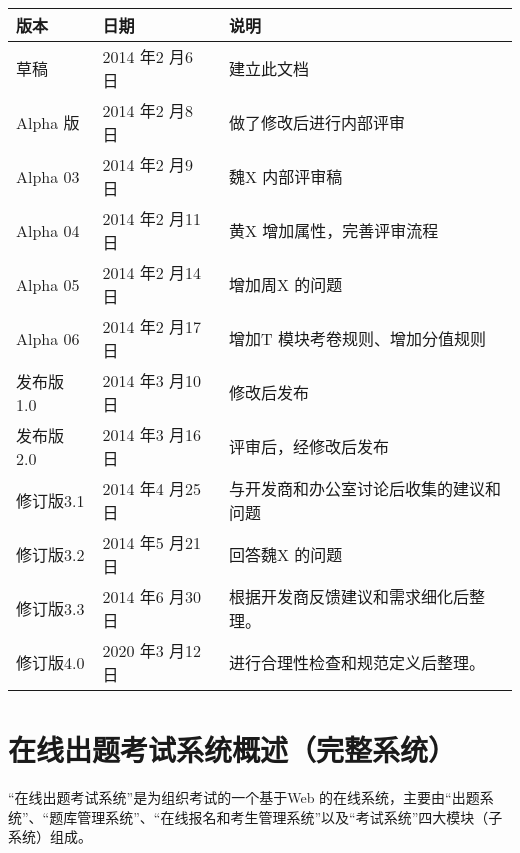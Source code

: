 \documentclass[hyperref, a4paper]{ctexart}
\begin{document}
\begin{center}
\begin{tabular}{|l|l|l|}
\hline
版本 & 日期 & 说明\\
\hline
草稿 & 2014 年2 月6 日 & 建立此文档\\
\hline
Alpha 版 & 2014 年2 月8 日 & 做了修改后进行内部评审\\
\hline
Alpha 03 & 2014 年2 月9 日 & 魏X 内部评审稿\\
\hline
Alpha 04 & 2014 年2 月11 日 & 黄X 增加属性，完善评审流程\\
\hline
Alpha 05 & 2014 年2 月14 日 & 增加周X 的问题\\
\hline
Alpha 06 & 2014 年2 月17 日 & 增加T 模块考卷规则、增加分值规则\\
\hline
发布版 1.0 & 2014 年3 月10 日 & 修改后发布\\
\hline
发布版 2.0 & 2014 年3 月16 日 & 评审后，经修改后发布\\
\hline
修订版3.1 & 2014 年4 月25 日 & 与开发商和办公室讨论后收集的建议和问题\\
\hline
修订版3.2 & 2014 年5 月21 日 & 回答魏X 的问题\\
\hline
修订版3.3 & 2014 年6 月30 日 & 根据开发商反馈建议和需求细化后整理。\\
\hline
修订版4.0 & 2020 年3 月12 日 & 进行合理性检查和规范定义后整理。\\
\hline
\end{tabular}
\end{center}

\normalsize

\newpage

\tableofcontents

\newpage

\hypertarget{ux5728ux7ebfux51faux9898ux8003ux8bd5ux7cfbux7edfux6982ux8ff0ux5b8cux6574ux7cfbux7edf}{%
\section*{在线出题考试系统概述（完整系统）}\label{ux5728ux7ebfux51faux9898ux8003ux8bd5ux7cfbux7edfux6982ux8ff0ux5b8cux6574ux7cfbux7edf}}

``在线出题考试系统''是为组织考试的一个基于Web
的在线系统，主要由``出题系统''、``题库管理系统''、``在线报名和考生管理系统''以及``考试系统''四大模块（子系统）组成。
\end{document}
